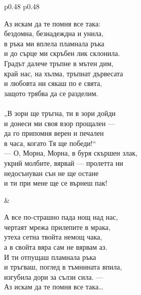 \documentclass[12pt,a4paper]{article}
\begin{document}
\begin{tabular}{p{0.48\textwidth} p{0.48\textwidth}}
\begin{minipage}[t]{\linewidth}
Аз искам да те помня все така:\\
бездомна, безнадеждна и унила,\\
в ръка ми вплела пламнала ръка\\
и до сърце ми скръбен лик склонила.\\
Градът далече тръпне в мътен дим,\\
край нас, на хълма, тръпнат дървесата\\
и любовта ни сякаш по е свята,\\
защото трябва да се разделим.\\
\\
„В зори ще тръгна, ти в зори дойди\\
и донеси ми своя взор прощален —\\
да го припомня верен и печален\\
в часа, когато Тя ще победи!“\\
— О, Морна, Морна, в буря скършен злак,\\
укрий молбите, вярвай — пролетта ни\\
недосънуван сън не ще остане\\
и ти при мене ще се върнеш пак!\\
\end{minipage}
&
\begin{minipage}[t]{\linewidth}
А все по-страшно пада нощ над нас,\\
чертаят мрежа прилепите в мрака,\\
утеха сетна твойта немощ чака,\\
а в свойта вяра сам не вярвам аз.\\
И ти отпущаш пламнала ръка\\
и тръгваш, поглед в тъмнината впила,\\
изгубила дори за сълзи сила. —\\
Аз искам да те помня все така…\\
\end{minipage}
\end{tabular}
\end{document}
